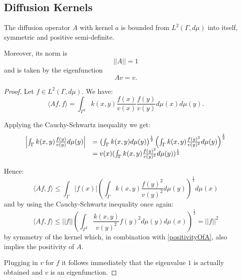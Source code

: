 \subsection{Diffusion Kernels}
\begin{theorem}
The diffusion operator $A$ with kernel $a$ is bounded from $L^2(\Gamma, d\mu)$ into itself, symmetric and positive semi-definite.

Moreover, its norm is $$||A||=1$$ and is taken by the eigenfunction $$Av=v.$$
\end{theorem}
\begin{proof}
Let $f\in L^2(\Gamma, d\mu)$. We have:
\begin{equation}\label{positivityOfA}
\langle Af,f \rangle = \int_{\Gamma^2}k(x,y)\frac{f(x)}{v(x)}\frac{f(y)}{v(y)}d\mu(x)d\mu(y).
\end{equation}

Applying the Cauchy-Schwartz inequality we get:
\begin{equation*}\begin{array}{l l}
\left|\int_\Gamma k(x,y)\frac{f(y)}{v(y)}d\mu(y)\right| &= 
\left(\int_\Gamma k(x,y)d\mu(y)\right)^{\frac{1}{2}}
\left(\int_\Gamma k(x,y)\frac{f(y)^2}{v(y)^2} d\mu(y)\right)^{\frac{1}{2}} \\
&=v(x)(\int_\Gamma k(x,y)\frac{f(y)^2}{v(y)^2} d\mu(y))^{\frac{1}{2}}
\end{array}\end{equation*}

Hence:
$$\langle Af,f \rangle \leq \int_\Gamma |f(x)|\left(\int_\Gamma k(x,y)\frac{f(y)^2}{v(y)^2} d\mu(y)\right)^{\frac{1}{2}}d\mu(x)$$
and by using the Cauchy-Schwartz inequality once again:
$$\langle Af,f \rangle \leq ||f||\left(\int_{\Gamma^2} \frac{k(x,y)}{v(y)^2}f(y)^2 d\mu(y)d\mu(x)\right)^{\frac{1}{2}} = ||f||^2$$ by symmetry of the kernel which, in combination with \eqref{positivityOfA}, also implies the positivity of $A$.

Plugging in $v$ for $f$ it follows immediately that the eigenvalue $1$ is actually obtained and $v$ is an eigenfunction.
\end{proof}

